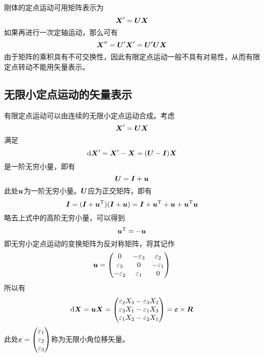 \begin{example}[有限定点运动的非对易性]

刚体的定点运动可用矩阵表示为
\begin{equation*}
	\boldsymbol{X}' = \boldsymbol{U}\boldsymbol{X}
\end{equation*}
如果再进行一次定轴运动，那么可有
\begin{equation*}
	\boldsymbol{X}'' = \boldsymbol{U}' \boldsymbol{X}' = \boldsymbol{U}' \boldsymbol{U} \boldsymbol{X}
\end{equation*}
由于矩阵的乘积具有不可交换性，因此有限定点运动一般不具有对易性，从而有限定点转动不能用矢量表示。
\end{example}

\subsection{无限小定点运动的矢量表示}

有限定点运动可以由连续的无限小定点运动合成。考虑
\begin{equation*}
	\boldsymbol{X}' = \boldsymbol{U}\boldsymbol{X}
\end{equation*}
满足
\begin{equation*}
	\mathrm{d} \boldsymbol{X}' = \boldsymbol{X}' - \boldsymbol{X} = (\boldsymbol{U}-\boldsymbol{I}) \boldsymbol{X}
\end{equation*}
是一阶无穷小量，即有
\begin{equation*}
	\boldsymbol{U} = \boldsymbol{I}+\boldsymbol{u}
\end{equation*}
此处$\boldsymbol{u}$为一阶无穷小量。$\boldsymbol{U}$应为正交矩阵，即有
\begin{equation*}
	\boldsymbol{I} = (\boldsymbol{I}+\boldsymbol{u}^{\mathrm{T}})(\boldsymbol{I}+\boldsymbol{u}) = \boldsymbol{I} + \boldsymbol{u}^{\mathrm{T}} + \boldsymbol{u} + \boldsymbol{u}^{\mathrm{T}} \boldsymbol{u}
\end{equation*}
略去上式中的高阶无穷小量，可以得到
\begin{equation}
	\boldsymbol{u}^{\mathrm{T}} = -\boldsymbol{u}
\end{equation}
即无穷小定点运动的变换矩阵为反对称矩阵，将其记作
\begin{equation*}
	\boldsymbol{u} = \begin{pmatrix} 0 & -\varepsilon_3 & \varepsilon_2 \\ \varepsilon_3 & 0 & -\varepsilon_1 \\ -\varepsilon_2 & \varepsilon_1 & 0 \end{pmatrix}
\end{equation*}
所以有
\begin{equation*}
	\mathrm{d} \boldsymbol{X} = \boldsymbol{u} \boldsymbol{X} = \begin{pmatrix} \varepsilon_2 X_3 - \varepsilon_3 X_2 \\ \varepsilon_3 X_1 - \varepsilon_1 X_3 \\ \varepsilon_1 X_2 - \varepsilon_2 X_1 \end{pmatrix} = \boldsymbol{\varepsilon} \times \boldsymbol{R}
\end{equation*}
此处$\boldsymbol{\varepsilon} = \begin{pmatrix} \varepsilon_1 \\ \varepsilon_2 \\ \varepsilon_3 \end{pmatrix}$称为{\heiti 无限小角位移矢量}。

